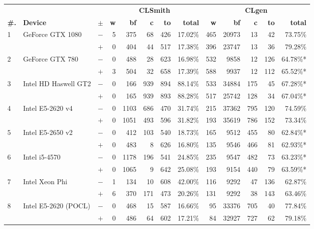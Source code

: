   \begin{tabular}{lll | rrrrr | rrrrr }
  \toprule
  & & & \multicolumn{5}{c|}{\textbf{CLSmith}} & \multicolumn{5}{c}{\textbf{CLgen}} \\
  \textbf{\#.} & \textbf{Device} & $\pm$ &
  \textbf{w} & \textbf{bf} & \textbf{c} & \textbf{to} & \textbf{total} &
  \textbf{w} & \textbf{bf} & \textbf{c} & \textbf{to} & \textbf{total} \\
  \midrule
  \multirow{ 2}{*}{1} & \multirow{ 2}{*}{GeForce GTX 1080} & $-$ & 5 & 375 & 68 & 426 & 17.02\%       & 465 & 20973 & 13 & 42 & 73.75\% \\& & $+$ & 0 & 404 & 44 & 517 & 17.38\% & 396 & 23747 & 13 & 36 & 79.28\% \\
\hline
\multirow{ 2}{*}{2} & \multirow{ 2}{*}{GeForce GTX 780} & $-$ & 0 & 488 & 28 & 623 & 16.98\%       & 532 & 9858 & 12 & 126 & 64.78\%* \\& & $+$ & 3 & 504 & 32 & 658 & 17.39\% & 588 & 9937 & 12 & 112 & 65.52\%* \\
\hline
\multirow{ 2}{*}{3} & \multirow{ 2}{*}{Intel HD Haswell GT2} & $-$ & 0 & 166 & 939 & 894 & 88.14\%       & 533 & 34884 & 175 & 45 & 67.28\%* \\& & $+$ & 0 & 165 & 939 & 893 & 88.28\% & 517 & 25742 & 128 & 34 & 67.04\%* \\
\hline
\multirow{ 2}{*}{4} & \multirow{ 2}{*}{Intel E5-2620 v4} & $-$ & 0 & 1103 & 686 & 470 & 31.74\%       & 215 & 37362 & 795 & 120 & 74.59\% \\& & $+$ & 0 & 1051 & 493 & 596 & 31.82\% & 193 & 35619 & 786 & 152 & 73.34\% \\
\hline
\multirow{ 2}{*}{5} & \multirow{ 2}{*}{Intel E5-2650 v2} & $-$ & 0 & 412 & 103 & 540 & 18.73\%       & 165 & 9512 & 455 & 80 & 62.84\%* \\& & $+$ & 0 & 483 & 8 & 626 & 16.80\% & 135 & 9546 & 466 & 81 & 62.93\%* \\
\hline
\multirow{ 2}{*}{6} & \multirow{ 2}{*}{Intel i5-4570} & $-$ & 0 & 1178 & 196 & 541 & 24.85\%       & 235 & 9547 & 482 & 73 & 63.23\%* \\& & $+$ & 0 & 1065 & 9 & 642 & 25.08\% & 193 & 9154 & 440 & 79 & 63.59\%* \\
\hline
\multirow{ 2}{*}{7} & \multirow{ 2}{*}{Intel Xeon Phi} & $-$ & 1 & 134 & 10 & 608 & 42.00\%       & 116 & 9292 & 47 & 136 & 62.87\% \\& & $+$ & 6 & 370 & 171 & 473 & 20.26\% & 131 & 9292 & 38 & 143 & 63.46\% \\
\hline
\multirow{ 2}{*}{8} & \multirow{ 2}{*}{Intel E5-2620 (POCL)} & $-$ & 0 & 468 & 15 & 587 & 16.66\%       & 95 & 33376 & 705 & 40 & 77.84\% \\& & $+$ & 0 & 486 & 64 & 602 & 17.21\% & 84 & 32927 & 727 & 62 & 79.18\% \\

\end{tabular}

